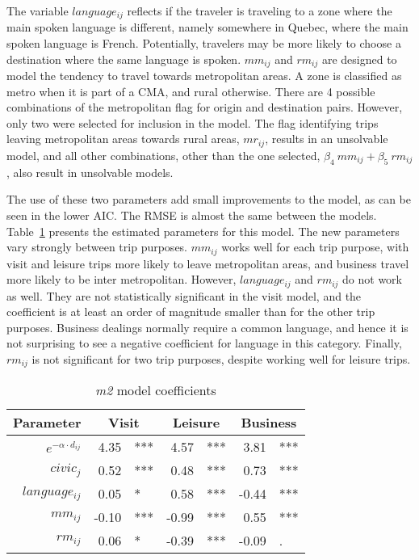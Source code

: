 The variable $language_{ij}$ reflects if the traveler is traveling to a zone where the main spoken language is different, namely somewhere in Quebec, where the main spoken language is French. Potentially, travelers may be more likely to choose a destination where the same language is spoken. $mm_{ij}$ and $rm_{ij}$ are designed to model the tendency to travel towards metropolitan areas. A zone is classified as metro when it is part of a CMA, and rural otherwise. There are 4 possible combinations of the metropolitan flag for origin and destination pairs. However, only two were selected for inclusion in the model. The flag identifying trips leaving metropolitan areas towards rural areas, $mr_{ij}$, results in an unsolvable model, and all other combinations, other than the one selected, $\beta_4~mm_{ij} + \beta_5~rm_{ij}$, also result in unsolvable models. 


The use of these two parameters add small improvements to the model, as can be seen in the lower AIC. The RMSE is almost the same between the models. Table~\ref{table:m2-coeff} presents the estimated parameters for this model. The new parameters vary strongly between trip purposes. 
$mm_{ij}$  works well for each trip purpose, with visit and leisure trips more likely to leave metropolitan areas, and business travel more likely to be inter metropolitan. However, $language_{ij}$ and $rm_{ij}$  do not work as well. They are not statistically significant in the visit model, and the coefficient is at least an order of magnitude smaller than for the other trip purposes. Business dealings normally require a common language, and hence it is not surprising to see a negative coefficient for language in this category. Finally, $rm_{ij}$  is not significant for two trip purposes, despite working well for leisure trips. 

\begin{table}[H]
\centering
\caption{\textit{m2} model coefficients}
\label{table:m2-coeff}
\begin{tabular}{@{}rrlrlrl@{}}
  \toprule
 Parameter & \multicolumn{2}{c}{Visit} & \multicolumn{2}{c}{Leisure} & \multicolumn{2}{c}{Business} \\ \midrule
  $e^{-\alpha  \cdot d_{ij}}$ 	& 4.35 & *** & 4.57 & *** & 3.81 & *** \\  
  $civic_j$ 		& 0.52 	& *** & 0.48 & *** & 0.73 & *** \\  
  $language_{ij}$ 	& 0.05 & * & 0.58 & *** & -0.44 & *** \\ 
  $mm_{ij}$  		& -0.10 & *** & -0.99 & *** & 0.55 & *** \\ 
  $rm_{ij}$			& 0.06 & * & -0.39 & *** & -0.09 & . \\  
   \bottomrule
\end{tabular}
\end{table}

